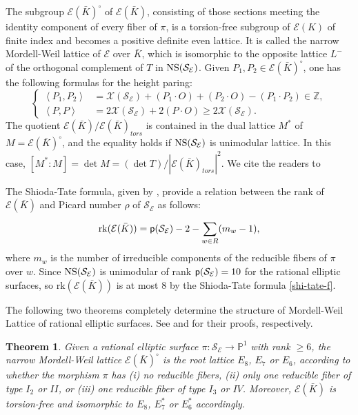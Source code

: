 \documentclass[11pt]{amsart}
\newcommand{\Kb}{{{\bar K}}}
\newcommand{\Z}{{\mathbb Z}}
\newcommand{\Pp}{{\mathbb P}}
\newcommand{\Ee}{{\mathcal E}}
\newcommand{\Sc}{{\mathcal S}}
\newcommand{\Xc}{{\mathcal X}}
\newcommand{\rk}{{\text{rk}}}
\newtheorem{thm}{Theorem}[section]
\numberwithin{equation}{section}
\numberwithin{table}{section}
\newcommand\<{\langle}
\begin{document}
The subgroup $\Ee(\Kb)^\circ$ of $\Ee(\Kb)$, consisting of those sections meeting the identity component of every fiber of $\pi$, 
is a torsion-free subgroup of $\Ee(K) $ of finite index and becomes a positive definite even lattice. 
It is called the {\sf narrow Mordell-Weil lattice} of $\Ee$ over $\Kb$, which is   isomorphic  to the opposite lattice $L^-$ of the orthogonal complement  of $T$ in ${\rm NS} (\Sc_\Ee)$. Given  $P_1, P_2 \in \Ee(\Kb)^\circ$, one has the following formulas for the height paring:
\begin{equation}
	\label{hf2}
	\begin{cases}
		\left\langle P_1, P_2\right\rangle & =\Xc (\Sc_\Ee)+ (P_1 \cdot O)+(P_2 \cdot O)- (P_1 \cdot P_2)\in \Z,\\
		\left\langle P, P\right\rangle &=2 \Xc (\Sc_\Ee)+ 2 (P\cdot  O) \geq 2 \Xc (\Sc_\Ee). 
	\end{cases}
\end{equation}
The quotient $\Ee(\Kb)/ \Ee(\Kb)_{tors}$ is contained in the dual lattice $M^*$ of $M=\Ee(\Kb)^\circ$, and the equality holds 
if ${\rm NS} (\Sc_\Ee)$ is unimodular lattice. In this case, 
$[M^*:M]=\det M=(\det T)/ | \Ee(\Kb)_{tors}|^2$. We cite the readers to  \cite[Theorem 9.1]{Shioda1992a}




The  {\sf Shioda-Tate} formula, given by  \cite[Crollary 5.3]{Shioda1990a}, provide a relation between the rank of $\Ee(\Kb)$ and Picard number   $\rho$  of $\Sc_\Ee$
as follows:
\begin{equation}
	\label{shi-tate-f}
	\rk(\Ee(\Kb))={\sf p}(\Sc_\Ee) -2 - \sum_{w\in R}^{}(m_{w}-1),
\end{equation}
where $m_{w}$ is the number of irreducible components of the reducible  fibers of  $\pi$ over $w$.
Since ${\rm NS} (\Sc_\Ee)$ is unimodular of rank  ${\sf p}(\Sc_\Ee) = 10$ for the  rational elliptic surfaces,
so  $\rk(\Ee(\Kb))$ is at most $8$ by the Shioda-Tate formula \eqref{shi-tate-f}.

The following two theorems completely determine the structure of Mordell-Weil Lattice of rational elliptic surfaces.
See \cite[Theorem 10.4]{Shioda1992a} and \cite[Theorem 10.10]{Shioda1992a} for their proofs, respectively.
\begin{thm}
	\label{shi1}
	Given 	a rational elliptic surface 	$\pi: \Sc_\Ee \rightarrow \Pp^1 $  with rank  $\geq 6$, 
	the narrow Mordell-Weil lattice $\Ee(\Kb)^\circ$ is the root lattice $E_8$, $E_7$ or $E_6$, according to whether 
	the morphism	$\pi $ has (i) no reducible fibers, (ii) only one reducible fiber of type $I_2$ or $II$,
	or (iii) one reducible fiber of type $I_3$ or $IV$. Moreover, $\Ee(\Kb)$ is torsion-free and isomorphic to  $E_8$, $E_7^*$ or $E_6^*$ accordingly.
\end{thm}
\end{document}
